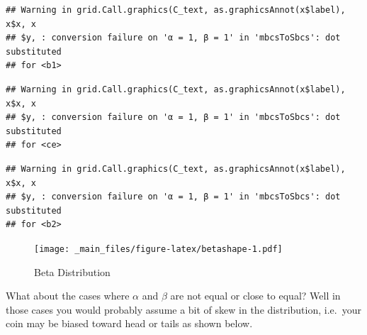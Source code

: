 \documentclass[]{book}
\theoremstyle{definition}
\theoremstyle{definition}
\theoremstyle{definition}
\theoremstyle{remark}
\begin{document}
\begin{verbatim}
## Warning in grid.Call.graphics(C_text, as.graphicsAnnot(x$label), x$x, x
## $y, : conversion failure on 'α = 1, β = 1' in 'mbcsToSbcs': dot substituted
## for <b1>
\end{verbatim}

\begin{verbatim}
## Warning in grid.Call.graphics(C_text, as.graphicsAnnot(x$label), x$x, x
## $y, : conversion failure on 'α = 1, β = 1' in 'mbcsToSbcs': dot substituted
## for <ce>
\end{verbatim}

\begin{verbatim}
## Warning in grid.Call.graphics(C_text, as.graphicsAnnot(x$label), x$x, x
## $y, : conversion failure on 'α = 1, β = 1' in 'mbcsToSbcs': dot substituted
## for <b2>
\end{verbatim}

\begin{figure}
\centering
\texttt{[image: \_main\_files/figure-latex/betashape-1.pdf]}
\caption{\label{fig:betashape}Beta Distribution}
\end{figure}

What about the cases where \(\alpha\) and \(\beta\) are not equal or
close to equal? Well in those cases you would probably assume a bit of
skew in the distribution, i.e.~your coin may be biased toward head or
tails as shown below.
\end{document}

